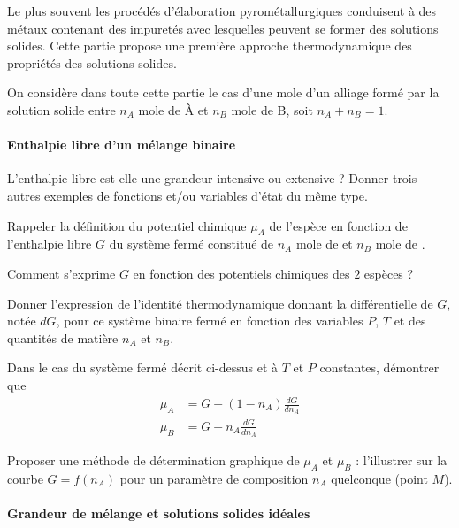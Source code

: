 
\setcounter{equation}{0}
\setcounter{Q}{0}

Le plus souvent les procédés d'élaboration pyrométallurgiques conduisent à des métaux contenant des impuretés avec lesquelles peuvent se former des solutions solides. Cette partie propose une première approche thermodynamique des propriétés des solutions solides.

On considère dans toute cette partie le cas d'une mole d'un alliage formé par la solution solide entre $n_A$ mole de À et $n_B$ mole de B, soit $n_A + n_B = 1$.

\paragraph*{Enthalpie libre d'un mélange binaire}
\Q  L'enthalpie libre est-elle une grandeur intensive ou extensive ? Donner trois autres exemples de fonctions et/ou variables d'état du même type.

\Q Rappeler la définition du potentiel chimique $\mu_A$ de l'espèce  en fonction de l'enthalpie libre $G$ du système fermé constitué de $n_A$ mole de  et $n_B$ mole de .

Comment s'exprime $G$ en fonction des potentiels chimiques des $2$ espèces ?

Donner l'expression de l'identité thermodynamique donnant la différentielle de $G$, notée $dG$, pour ce système binaire fermé en fonction des variables $P$, $T$ et des quantités de matière $n_A$ et $n_B$.

\Q \label{Q:01-03} Dans le cas du système fermé décrit ci-dessus et à $T$ et $P$ constantes, démontrer que
\begin{align*}
\mu_A &= G + (1-n_A) \frac{dG}{dn_A} \\
\mu_B &= G - n_A \frac{dG}{dn_A}
\end{align*}

\Q \label{Q:01-04} Proposer une méthode de détermination graphique de $\mu_A$ et $\mu_B$ : l'illustrer sur la courbe $G = f(n_A)$ pour un paramètre de composition $n_A$ quelconque (point $M$).

\paragraph*{Grandeur de mélange et solutions solides idéales}

